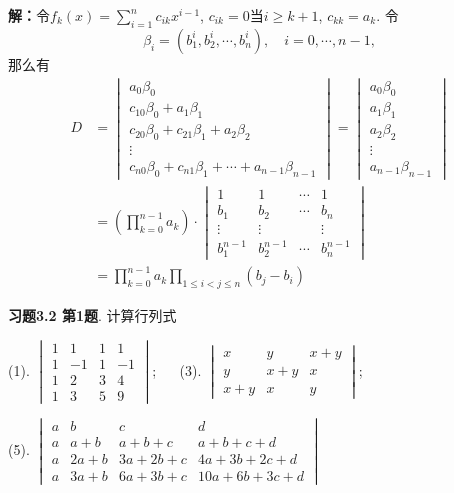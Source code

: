 {\bf 解：}令$f_k(x) = \sum\limits_{i=1}^n c_{ik} x^{i-1}$, $c_{ik} = 0$当$i \geqslant k+1$, $c_{kk} = a_k$. 令
$$\beta_i = (b_1^{i}, b_2^{i}, \cdots, b_n^{i}), \quad i = 0,\cdots,n-1,$$
那么有
\begin{align*}
D & = \begin{vmatrix}
a_0\beta_0 \\ c_{10}\beta_0 + a_1\beta_1 \\ c_{20}\beta_0 + c_{21}\beta_1 + a_2\beta_2 \\ \vdots \\ c_{n0}\beta_0 + c_{n1}\beta_1 + \cdots + a_{n-1}\beta_{n-1}
\end{vmatrix}
= \begin{vmatrix}
a_0\beta_0 \\ a_1\beta_1 \\ a_2\beta_2 \\ \vdots \\ a_{n-1}\beta_{n-1}
\end{vmatrix} \\
& = \left( \prod_{k=0}^{n-1} a_k \right) \cdot \begin{vmatrix} 1 & 1 & \cdots & 1 \\ b_1 & b_2 & \cdots & b_n \\ \vdots & \vdots & & \vdots \\ b_1^{n-1} & b_2^{n-1} & \cdots & b_n^{n-1} \end{vmatrix} \\
& = \prod_{k=0}^{n-1} a_k \prod_{1\leqslant i < j \leqslant n} (b_j-b_i)
\end{align*}

\newpageorvspace

{\bf 习题3.2 第1题}. 计算行列式

(1). $\begin{vmatrix} 1 & 1 & 1 & 1 \\ 1 & -1 & 1 & -1 \\ 1 & 2 & 3 & 4 \\ 1 & 3 & 5 & 9 \end{vmatrix}$; $\quad$ (3). $\begin{vmatrix} x & y & x+y \\ y & x+y & x \\ x+y & x & y \end{vmatrix}$;

(5). $\begin{vmatrix} a & b & c & d \\ a & a+b & a+b+c & a+b+c+d \\ a & 2a+b & 3a+2b+c & 4a+3b+2c+d \\ a & 3a+b & 6a+3b+c & 10a+6b+3c+d \end{vmatrix}$

